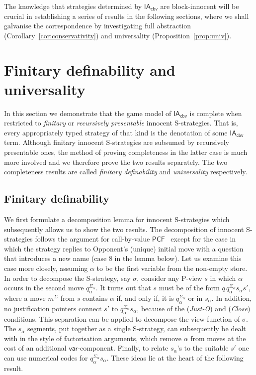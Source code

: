 \documentclass{CSML}
\theoremstyle{definition}\newtheorem{definition}[thm]{Definition}
\theoremstyle{definition}\newtheorem{example}[thm]{Example}
\theoremstyle{definition}\newtheorem{proposition}[thm]{Proposition}
\theoremstyle{definition}\newtheorem{lemma}[thm]{Lemma}
\theoremstyle{definition}\newtheorem{theorem}[thm]{Theorem}
\theoremstyle{definition}\newtheorem{corollary}[thm]{Corollary}
\theoremstyle{definition}\newtheorem{remark}[thm]{Remark}
\renewcommand\Sigma{\varSigma}
\newcommand\pcf{\mathsf{PCF}}
\newcommand\iacbv{\mathsf{IA}_{\mathsf{cbv}}}
\newcommand\vart{\mathsf{var}}
\begin{document}
\noindent The knowledge that strategies determined by $\iacbv$ are block-innocent
will be crucial in establishing a series of results in the following sections, where
we shall galvanise the correspondence by investigating 
full abstraction (Corollary~\ref{cor:conservativity}) and universality (Proposition~\ref{prop:univ}).








\section{Finitary definability and universality}

In this section we demonstrate that the game model of $\iacbv$ is complete when restricted to
\emph{finitary} or \emph{recursively presentable} innocent S-strategies. That is, every appropriately typed strategy of that kind is the denotation of some $\iacbv$ term. 
{Although finitary innocent S-strategies are subsumed by recursively presentable ones, the method of proving completeness in the latter case is much more involved and we therefore prove the two results separately. The two completeness results are called \emph{finitary definability} and \emph{universality} respectively.}

\subsection{Finitary definability}

We first formulate a decomposition lemma for innocent S-strategies which subsequently allows us to show the two results. The decomposition of innocent S-strategies follows the argument for call-by-value $\pcf$~\cite{HY97} except for the case in which the strategy replies to Opponent's (unique) initial move with a question that introduces a new name (case 8 in the lemma below).
Let us examine this case more closely, assuming
$\alpha$ to be the first variable from the non-empty store.
In order to decompose the S-strategy, say $\sigma$, consider any P-view $s$
in which $\alpha$ occurs in the second move $q_\alpha^{\Sigma_\alpha}$. It turns out
that $s$ must be of the form $q\, q_\alpha^{\Sigma_\alpha} s_\alpha s'$, where a move $m^\Sigma$ from $s$
contains $\alpha$ if, and only if, it is $q_\alpha^{\Sigma_\alpha}$ or in $s_\alpha$. In addition,
no justification pointers connect $s'$ to $q_\alpha^{\Sigma_\alpha} s_\alpha$, because of the
({\em Just-O}) and ({\em Close}) conditions.
This separation can be applied to decompose the view-function of $\sigma$. 
The $s_\alpha$ segments, put together as a single S-strategy,
can subsequently be dealt with in the style of factorisation arguments,
which remove $\alpha$ from moves
at the cost of an additional $\vart$-component.
Finally, to relate $s_\alpha$'s to the suitable $s'$ one can use numerical codes
for $q_\alpha^{\Sigma_\alpha} s_\alpha$. These ideas lie at the heart of the following result.
\end{document}
